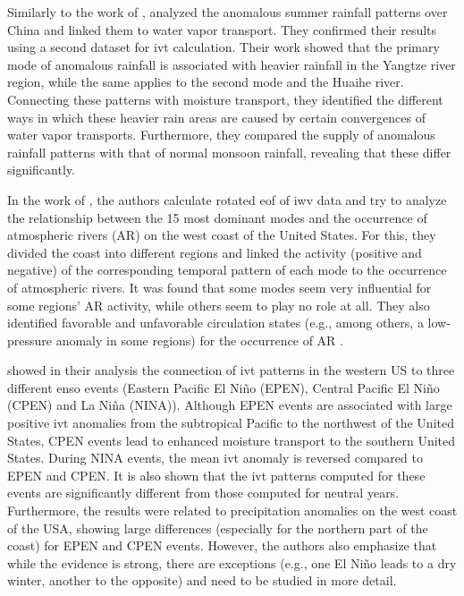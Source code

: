 Similarly to the work of , \citeauthor{zhou_atmospheric_2005} analyzed the anomalous summer rainfall patterns over China and linked them to water vapor transport. 
They confirmed their results using a second dataset for \ac{ivt} calculation. 
Their work showed that the primary mode of anomalous rainfall is associated with heavier rainfall in the Yangtze river region, while the same applies to the second mode and the Huaihe river. 
Connecting these patterns with moisture transport, they identified the different ways in which these heavier rain areas are caused by certain convergences of water vapor transports. 
Furthermore, they compared the supply of anomalous rainfall patterns with that of normal monsoon rainfall, revealing that these differ significantly. \cite{zhou_atmospheric_2005}


In the work of , the authors calculate rotated \ac{eof} of \ac{iwv} data and try to analyze the relationship between the 15 most dominant modes and the occurrence of atmospheric rivers (AR) on the west coast of the United States. 
For this, they divided the coast into different regions and linked the activity (positive and negative) of the corresponding temporal pattern of each mode to the occurrence of atmospheric rivers. 
It was found that some modes seem very influential for some regions' AR activity, while others seem to play no role at all. 
They also identified favorable and unfavorable circulation states (e.g., among others, a low-pressure anomaly in some regions) for the occurrence of AR \cite{guirguis_circulation_2018}. 


\citeauthor{kim_ensos_2015} showed in their analysis the connection of \ac{ivt} patterns in the western US to three different \ac{enso} events (Eastern Pacific El Niño (EPEN), Central Pacific El Niño (CPEN) and La Niña (NINA)). 
Although EPEN events are associated with large positive \ac{ivt} anomalies from the subtropical Pacific to the northwest of the United States, CPEN events lead to enhanced moisture transport to the southern United States. 
During NINA events, the mean \ac{ivt} anomaly is reversed compared to EPEN and CPEN. 
It is also shown that the \ac{ivt} patterns computed for these events are significantly different from those computed for neutral years.
Furthermore, the results were related to precipitation anomalies on the west coast of the USA, showing large differences (especially for the northern part of the coast) for EPEN and CPEN events. 
However, the authors also emphasize that while the evidence is strong, there are exceptions (e.g., one El Niño leads to a dry winter, another to the opposite) and need to be studied in more detail. \cite{kim_ensos_2015}

